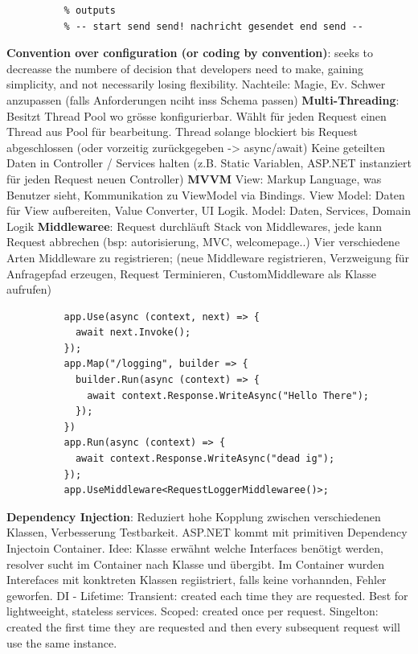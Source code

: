 \documentclass[10pt,landscape]{article}
\begin{document}
\begin{multicols}{2}
\begin{lstlisting}
          % outputs
          % -- start send send! nachricht gesendet end send -- 
        \end{lstlisting}
        \textbf{Convention over configuration (or coding by convention)}: seeks to decreasse the numbere of decision that developers need to make, gaining simplicity, and not necessarily losing flexibility.
        Nachteile: Magie, Ev. Schwer anzupassen (falls Anforderungen nciht inss Schema passen)
        \textbf{Multi-Threading}: Besitzt Thread Pool wo grösse konfigurierbar. Wählt für jeden Request einen Thread aus Pool für bearbeitung.
        Thread solange blockiert bis Request abgeschlossen (oder vorzeitig zurückgegeben -> async/await)
        Keine geteilten Daten in Controller / Services halten (z.B. Static Variablen, ASP.NET instanziert für jeden Request neuen Controller)
        \textbf{MVVM} View: Markup Language, was Benutzer sieht, Kommunikation zu ViewModel via Bindings. View Model: Daten für View aufbereiten, Value Converter, UI Logik. Model: Daten, Services, Domain Logik
        \textbf{Middlewaree}: Request durchläuft Stack von Middlewares, jede kann Request abbrechen (bsp: autorisierung, MVC, welcomepage..)
        Vier verschiedene Arten Middleware zu registrieren; (neue Middleware registrieren, Verzweigung für Anfragepfad erzeugen, Request Terminieren, CustomMiddleware als Klasse aufrufen)
        \begin{lstlisting}
          app.Use(async (context, next) => {
            await next.Invoke();
          });
          app.Map("/logging", builder => {
            builder.Run(async (context) => {
              await context.Response.WriteAsync("Hello There");
            });
          })
          app.Run(async (context) => {
            await context.Response.WriteAsync("dead ig");
          });
          app.UseMiddleware<RequestLoggerMiddlewaree()>;
        \end{lstlisting}
        \textbf{Dependency Injection}: Reduziert hohe Kopplung zwischen verschiedenen Klassen, Verbesserung Testbarkeit. ASP.NET kommt mit primitiven Dependency Injectoin Container.
        Idee: Klasse erwähnt welche Interfaces benötigt werden, resolver sucht im Container nach Klasse und übergibt. Im Container wurden Interefaces mit konktreten Klassen regiistriert, falls keine vorhannden, Fehler geworfen.
        DI - Lifetime: Transient: created each time they are requested. Best for lightweeight, stateless services. Scoped: created once per request. Singelton: created the first time they are requested and then every subsequent request will use the same instance.

\end{multicols}
\end{document}
